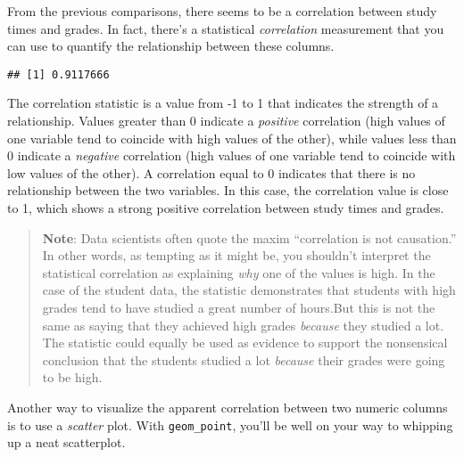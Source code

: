 \documentclass[
]{article}
\newenvironment{Shaded}{\begin{snugshade}}{\end{snugshade}}
\newcommand{\CommentTok}[1]{\textcolor[rgb]{0.56,0.35,0.01}{\textit{#1}}}
\newcommand{\FunctionTok}[1]{\textcolor[rgb]{0.00,0.00,0.00}{#1}}
\newcommand{\NormalTok}[1]{#1}
\newcommand{\SpecialCharTok}[1]{\textcolor[rgb]{0.00,0.00,0.00}{#1}}
\begin{document}
From the previous comparisons, there seems to be a correlation between
study times and grades. In fact, there's a statistical
\emph{correlation} measurement that you can use to quantify the
relationship between these columns.

\begin{Shaded}
\end{Shaded}

\begin{verbatim}
## [1] 0.9117666
\end{verbatim}

The correlation statistic is a value from -1 to 1 that indicates the
strength of a relationship. Values greater than 0 indicate a
\emph{positive} correlation (high values of one variable tend to
coincide with high values of the other), while values less than 0
indicate a \emph{negative} correlation (high values of one variable tend
to coincide with low values of the other). A correlation equal to 0
indicates that there is no relationship between the two variables. In
this case, the correlation value is close to 1, which shows a strong
positive correlation between study times and grades.

\begin{quote}
\textbf{Note}: Data scientists often quote the maxim ``correlation is
not causation.'' In other words, as tempting as it might be, you
shouldn't interpret the statistical correlation as explaining \emph{why}
one of the values is high. In the case of the student data, the
statistic demonstrates that students with high grades tend to have
studied a great number of hours.But this is not the same as saying that
they achieved high grades \emph{because} they studied a lot. The
statistic could equally be used as evidence to support the nonsensical
conclusion that the students studied a lot \emph{because} their grades
were going to be high.
\end{quote}

Another way to visualize the apparent correlation between two numeric
columns is to use a \emph{scatter} plot. With \texttt{geom\_point},
you'll be well on your way to whipping up a neat scatterplot.
\end{document}
